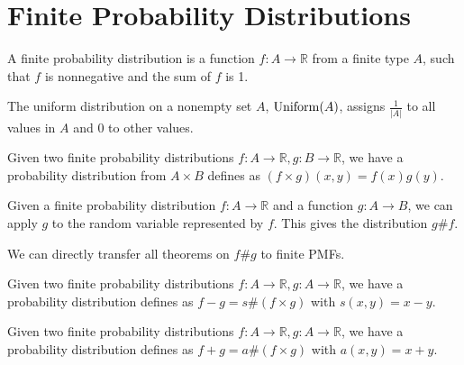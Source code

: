 \chapter{Finite Probability Distributions}
\label{chap:finpmf}

\begin{definition}
    \label{FinPMF}
    \leanok
    A finite probability distribution is a function $f : A \to \mathbb{R}$ from a finite type $A$, such that $f$ is nonnegative and the sum of $f$ is
    1.
\end{definition}

\begin{definition}
    \label{Uniform}
    \leanok
    The uniform distribution on a nonempty set $A$, $\operatorname{\operatorname{Uniform}}(A)$, assigns $\frac1{|A|}$ to all values in $A$ and $0$ to other values.
\end{definition}

\begin{definition}
    \label{instMulFinPMF}
    \leanok
    Given two finite probability distributions $f: A \to \mathbb{R}, g : B \to \mathbb{R}$, we have a probability distribution
    from $A \times B$ defines as $(f \times g)(x, y) = f(x) g(y)$.
\end{definition}

\begin{definition}
    \label{FinPMF.apply}
    \leanok
    Given a finite probability distribution $f: A \to \mathbb{R}$ and a function $g : A \to B$, we can apply $g$ to the random variable
    represented by $f$. This gives the distribution $g \# f$.
\end{definition}

We can directly transfer all theorems on $f \# g$ to finite PMFs.

\begin{definition}
    \label{instSubFinPMF}
    \leanok
    Given two finite probability distributions $f: A \to \mathbb{R}, g : A \to \mathbb{R}$, we have a probability distribution
    defines as $f-g = s \# (f \times g)$ with $s(x, y) = x-y$.
\end{definition}

\begin{definition}
    \label{instAddFinPMF}
    \leanok
    Given two finite probability distributions $f: A \to \mathbb{R}, g : A \to \mathbb{R}$, we have a probability distribution
    defines as $f+g = a \# (f \times g)$ with $a(x, y) = x+y$.
\end{definition}

